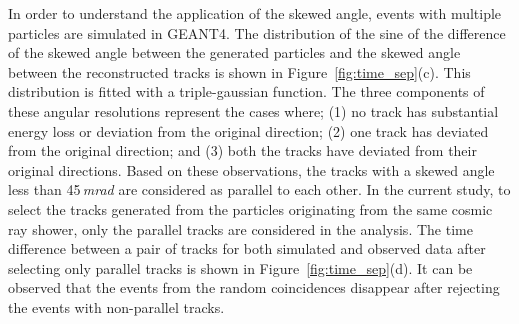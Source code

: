 \documentclass[a4paper,12pt,twoside]{article}
\begin{document}
In order to understand the application of the skewed angle, events with multiple particles are simulated in GEANT4. The distribution of the sine of the difference of the skewed angle between the generated particles and the skewed angle between the reconstructed tracks is shown in Figure~\ref{fig:time_sep}(c). This distribution is fitted with a triple-gaussian function. The three components of these angular resolutions represent the cases where; (1) no track has substantial energy loss or deviation from the original direction; (2) one track has deviated from the original direction; and (3) both the tracks have deviated from their original directions. Based on these observations, the tracks with a skewed angle less than 45\,\textit{mrad} are considered as parallel to each other. In the current study, to select the tracks generated from the particles originating from the same cosmic ray shower, only the parallel tracks are considered in the analysis. The time difference between a pair of tracks for both simulated and observed data after selecting only parallel tracks is shown in Figure~\ref{fig:time_sep}(d). It can be observed that the events from the random coincidences disappear after rejecting the events with non-parallel tracks.
\end{document}

